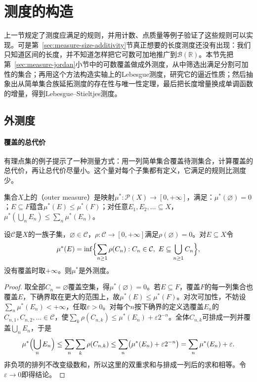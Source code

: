 \section{测度的构造}
\label{sec:measure-construction}

上一节规定了测度应满足的规则，并用计数、点质量等例子验证了这些规则可以实现。可是第~\ref{sec:measure-size-additivity}节真正想要的长度测度还没有出现：我们只知道区间的长度，并不知道怎样把它可数可加地推广到$\mathcal B(\mathbb R)$。本节先把第~\ref{sec:measure-jordan}小节中的可数覆盖做成外测度，从中筛选出满足分割可加性的集合；再用这个方法构造实轴上的Lebesgue测度，研究它的逼近性质；然后抽象出从简单集合族延拓测度的存在性与唯一性定理，最后把长度增量换成单调函数的增量，得到Lebesgue--Stieltjes测度。

\subsection{外测度}
\label{sec:measure-outer-measure}

\paragraph{覆盖的总代价}
有理点集的例子提示了一种测量方式：用一列简单集合覆盖待测集合，计算覆盖的总代价，再让总代价尽量小。这个量对每个子集都有定义，它满足的规则比测度少。

\begin{definition}[外测度]
\label{def:measure-outer}
集合$X$上的（outer measure）是映射$\mu^*:\mathcal P(X)\to[0,+\infty]$，满足：$\mu^*(\varnothing)=0$；$E\subseteq F$蕴含$\mu^*(E)\le\mu^*(F)$；对任意$E_1,E_2,\dots\subseteq X$，$\mu^*(\bigcup_nE_n)\le\sum_n\mu^*(E_n)$。
\end{definition}

\begin{lemma}[由覆盖得到外测度]
\label{lem:measure-cover-outer}
设$\mathcal C$是$X$的一族子集，$\varnothing\in\mathcal C$，$\rho:\mathcal C\to[0,+\infty]$满足$\rho(\varnothing)=0$。对$E\subseteq X$令
\[
 \mu^*(E)=\inf\Bigl\{\sum_{n\ge1}\rho(C_n):C_n\in\mathcal C,\ E\subseteq\bigcup_{n\ge1}C_n\Bigr\},
\]
没有覆盖时取$+\infty$。则$\mu^*$是外测度。
\end{lemma}

\begin{proof}
取全部$C_n=\varnothing$覆盖空集，得$\mu^*(\varnothing)=0$。若$E\subseteq F$，覆盖$F$的每一列集合也覆盖$E$，下确界取在更大的范围上，故$\mu^*(E)\le\mu^*(F)$。对次可加性，不妨设$\sum_n\mu^*(E_n)<+\infty$，任取$\varepsilon>0$。对每个$n$按下确界的定义选覆盖$E_n$的$C_{n,1},C_{n,2},\dots\in\mathcal C$，使$\sum_k\rho(C_{n,k})\le\mu^*(E_n)+\varepsilon2^{-n}$。全体$C_{n,k}$可排成一列并覆盖$\bigcup_nE_n$，于是
\[
 \mu^*\Bigl(\bigcup_nE_n\Bigr)\le\sum_n\sum_k\rho(C_{n,k})\le\sum_n\bigl(\mu^*(E_n)+\varepsilon2^{-n}\bigr)=\sum_n\mu^*(E_n)+\varepsilon.
\]
非负项的排列不改变级数和，所以这里的双重求和与排成一列后的求和相等。令$\varepsilon\to0$即得结论。
\end{proof}

